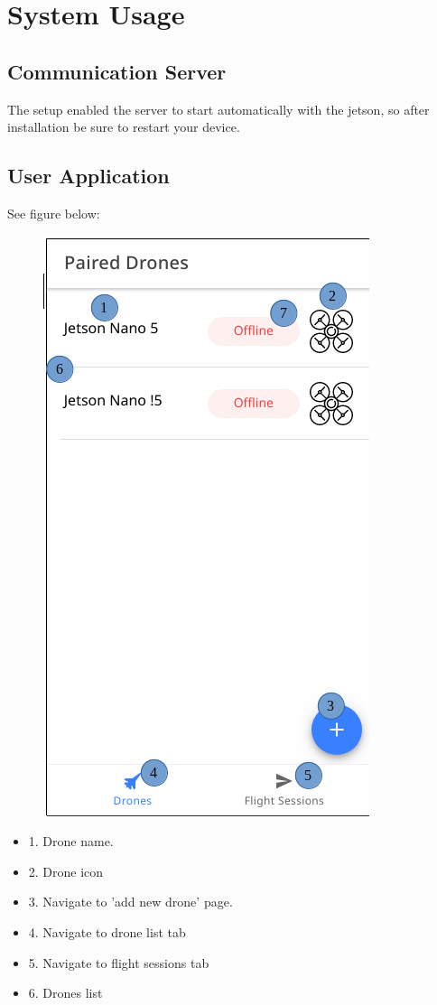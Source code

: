 \chapter{System Usage}

\section{Communication Server}

The setup enabled the server to start automatically with the jetson, so after installation be sure to restart your device.

\section{ User Application }
See figure below:
\begin{figure}[h!]
	\centering
	\includegraphics[scale=0.5]{./assets/images/offline.png}
	\label{fig: screens}
	\caption{}
\end{figure}
\begin{itemize}
		\item 1. Drone name.
		\item 2. Drone icon
		\item 3. Navigate to 'add new drone' page.
		\item 4. Navigate to drone list tab
		\item 5. Navigate to flight sessions tab
		\item 6. Drones list
		
\end{itemize}

